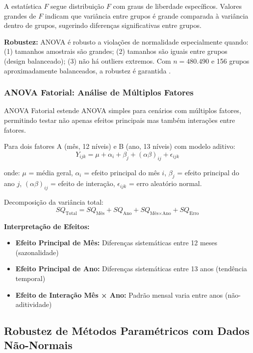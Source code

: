 \documentclass[12pt,a4paper]{article}
\begin{document}
A estatística $F$ segue distribuição $F$ com graus de liberdade específicos. Valores grandes de $F$ indicam que variância entre grupos é grande comparada à variância dentro de grupos, sugerindo diferenças significativas entre grupos.

\textbf{Robustez:} ANOVA é robusto a violações de normalidade especialmente quando: (1) tamanhos amostrais são grandes; (2) tamanhos são iguais entre grupos (design balanceado); (3) não há outliers extremos. Com $n = 480.490$ e 156 grupos aproximadamente balanceados, a robustez é garantida \cite{Montgomery2013, Devore2015}.

\subsubsection{ANOVA Fatorial: Análise de Múltiplos Fatores}

ANOVA Fatorial estende ANOVA simples para cenários com múltiplos fatores, permitindo testar não apenas efeitos principais mas também interações entre fatores.

Para dois fatores A (mês, 12 níveis) e B (ano, 13 níveis) com modelo aditivo:
\begin{equation}
Y_{ijk} = \mu + \alpha_i + \beta_j + (\alpha\beta)_{ij} + \epsilon_{ijk}
\end{equation}

onde: $\mu$ = média geral, $\alpha_i$ = efeito principal do mês $i$, $\beta_j$ = efeito principal do ano $j$, $(\alpha\beta)_{ij}$ = efeito de interação, $\epsilon_{ijk}$ = erro aleatório normal.

Decomposição da variância total:
\begin{equation}
SQ_{\text{Total}} = SQ_{\text{Mês}} + SQ_{\text{Ano}} + SQ_{\text{Mês} \times \text{Ano}} + SQ_{\text{Erro}}
\end{equation}

\textbf{Interpretação de Efeitos:}
\begin{itemize}
    \item \textbf{Efeito Principal de Mês:} Diferenças sistemáticas entre 12 meses (sazonalidade)
    \item \textbf{Efeito Principal de Ano:} Diferenças sistemáticas entre 13 anos (tendência temporal)
    \item \textbf{Efeito de Interação Mês × Ano:} Padrão mensal varia entre anos (não-aditividade)
\end{itemize}

\subsection{Robustez de Métodos Paramétricos com Dados Não-Normais}
\end{document}
